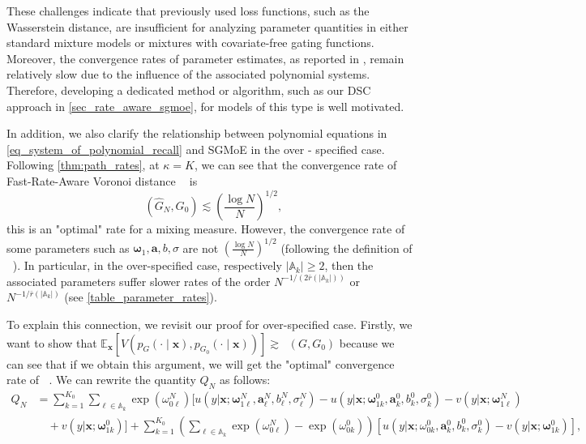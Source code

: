 \documentclass[twoside]{article}
\DeclareMathOperator*{\VDFRA}{D_{FRA}}
\theoremstyle{plain}
\theoremstyle{definition}
\theoremstyle{plain}
\def\rvx{{\mathbf{x}}}
\def\vomega{{\bm{\omega}}}
\def\va{{\bm{a}}}
\def\vx{{\bm{x}}}
\def\sA{{\mathbb{A}}}
\newcommand{\E}{\mathbb{E}}
\begin{document}
These challenges indicate that previously used loss functions, such as the Wasserstein distance, are insufficient for analyzing parameter quantities in either standard mixture models or mixtures with covariate-free gating functions. Moreover, the convergence rates of parameter estimates, as reported in \cite{nguyen_demystifying_2023}, remain relatively slow due to the influence of the associated polynomial systems. Therefore, developing a dedicated method or algorithm, such as our DSC approach in \cref{sec_rate_aware_sgmoe}, for models of this type is well motivated.

In addition, we also clarify the relationship between polynomial equations in \cref{eq_system_of_polynomial_recall} and SGMoE in the over - specified case. Following \cref{thm:path_rates}, at $\kappa = K$, we can see that the convergence rate of Fast-Rate-Aware Voronoi distance $\VDFRA$ is $$\VDFRA (\widehat{G}_N, G_0) \lesssim \left( \frac{\log N}{N} \right)^{1/2},$$ this is an "optimal" rate for a mixing measure. However, the convergence rate of some parameters such as $\vomega_1, \va, b, \sigma$ are not $\left( \frac{\log N}{N} \right)^{1/2}$ (following the definition of $\VDFRA$). In particular, in the over-specified case, respectively $|\sA_k| \geq 2$, then the associated parameters suffer slower rates of the order $N^{-1/(2\bar r(|\sA_k|))}$ or $N^{-1/\bar r(|\sA_k|)}$ (see \cref{table_parameter_rates}). 

To explain this connection, we revisit our proof for over-specified case. Firstly, we want to show that $\E_{\rvx}\left[V\left(p_{G}(\cdot \mid \vx), p_{G_{0}}(\cdot \mid \vx)\right)\right] \gtrsim \VDFRA\left(G, G_{0}\right)$ because we can see that if we obtain this argument, we will get the "optimal" convergence rate of $\VDFRA$. We can rewrite the quantity $Q_N$ as follows:
\begin{align*}
Q_{N} & =\sum_{k=1}^{K_0} \sum_{\ell \in \sA_k} \exp \left(\omega_{0 \ell}^N\right) \bigg[u\left(y|\vx ; \vomega_{1 \ell}^N, \va_{\ell}^N, b_{\ell}^N, \sigma_{\ell}^N\right)-u\left(y|\vx ; \vomega_{1k}^{0}, \va_{k}^{0}, b_{k}^{0}, \sigma_{k}^{0}\right)-v\left(y|\vx ; \vomega_{1 \ell}^N\right) \\
&\quad +v\left(y|\vx ; \vomega_{1k}^{0}\right)\bigg]+\sum_{k=1}^{K_0}\left(\sum_{\ell \in \sA_k} \exp \left(\omega_{0 \ell}^N\right)-\exp \left(\omega_{0k}^{0}\right)\right)\left[u\left(y|\vx ; \omega_{0k}^{0}, \va_{k}^{0}, b_{k}^{0}, \sigma_{k}^{0}\right)-v\left(y|\vx ; \vomega_{1k}^{0}\right)\right],
\end{align*}
\end{document}
